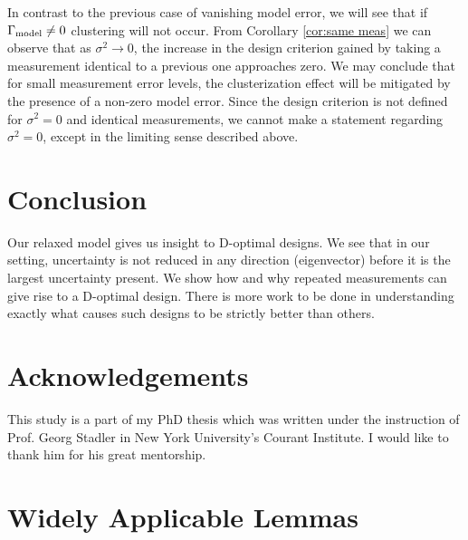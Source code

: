 \documentclass{amsart}
\numberwithin{equation}{section}
\begin{document}
In contrast to the previous case of vanishing model error, we will see
that if $\Gamma_{\textup{model}} \neq 0$ clustering will not occur. From Corollary
\ref{cor:same meas} we can observe that as $\sigma^2 \to 0$, the
increase in the design criterion gained by taking a measurement
identical to a previous one approaches zero. We may conclude that for
small measurement error levels, the clusterization effect will be
mitigated by the presence of a non-zero model error. Since the design
criterion is not defined for $\sigma^2 = 0$ and identical
measurements, we cannot make a statement regarding $\sigma^2 = 0$,
except in the limiting sense described above.

\section{Conclusion}\label{section:conclusion}
Our relaxed model gives us insight to D-optimal designs. We see that
in our setting, uncertainty is not reduced in any direction
(eigenvector) before it is the largest uncertainty present. We show
how and why repeated measurements can give rise to a D-optimal
design. There is more work to be done in understanding exactly what
causes such designs to be strictly better than others.


\section{Acknowledgements}
This study is a part of my PhD thesis \cite{mine} which was written
under the instruction of Prof. Georg Stadler in New York University's
Courant Institute. I would like to thank him for his great mentorship.

\appendix
\section{Widely Applicable Lemmas}
\end{document}
